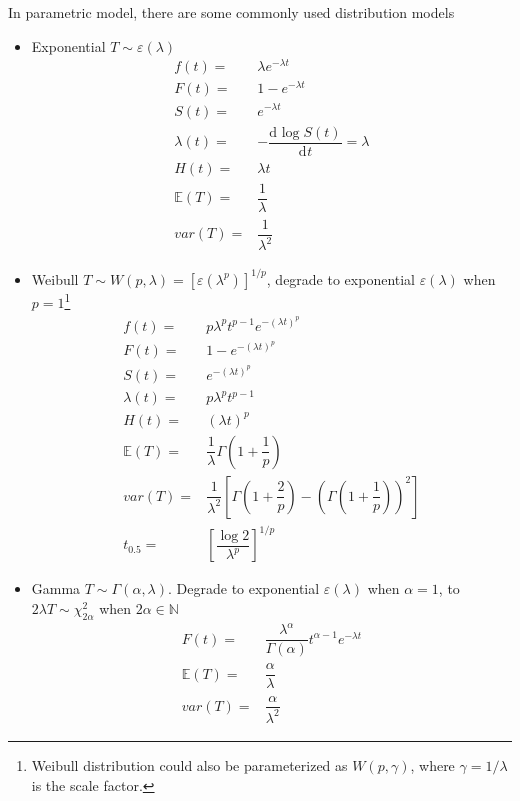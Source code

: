 In parametric model, there are some commonly used distribution models
\begin{itemize}[topsep=2pt,itemsep=0pt]
    \item Exponential $ T\sim \varepsilon (\lambda ) $
    \begin{align}
        f(t)=&\lambda e^{-\lambda t}\\
    F(t)=&1- e^{-\lambda t}\\
    S(t)=&e^{-\lambda t}\\
    \lambda (t)=&-\dfrac{\mathrm{d}^{} \log S(t)}{\mathrm{d}^{}t}=\lambda \\
    H(t)=&\lambda t\\
    \mathbb{E}(T)=&\dfrac{1}{\lambda }\\
    var(T)=&\dfrac{1}{\lambda ^2}
    \end{align}
    \item Weibull $T\sim W(p,\lambda )=\left[\varepsilon (\lambda ^p)\right]^{1/p}$, degrade to exponential $ \varepsilon (\lambda ) $ when $ p=1 $\footnote{Weibull distribution could also be parameterized as $ W(p,\gamma ) $, where $ \gamma =1/\lambda  $ is the scale factor.}
    \begin{align}
        f(t)=&p\lambda ^pt^{p-1}e^{-(\lambda t)^p}\\
        F(t)=&1-e^{-(\lambda t)^p}\\
        S(t)=&e^{-(\lambda t)^p}\\
        \lambda (t)=&p\lambda ^pt^{p-1}\\
        H(t)=&(\lambda t)^p\\
        \mathbb{E}(T)=&\dfrac{1}{\lambda }\Gamma(1+\dfrac{1}{p})\\
        var(T)=&\dfrac{1}{\lambda ^2}\left[ \Gamma (1+\dfrac{2}{p})-(\Gamma (1+\dfrac{1}{p}))^2 \right]\\
        t_{0.5}=&\left[ \dfrac{\log 2}{\lambda ^p} \right]^{1/p}
    \end{align}
    \item Gamma $T\sim \Gamma (\alpha ,\lambda )$. Degrade to exponential $ \varepsilon (\lambda ) $ when $ \alpha =1 $, to $ 2\lambda T\sim \chi^2_{2\alpha }  $ when $ 2\alpha \in\mathbb{N} $
    \begin{align}
        F(t)=&\dfrac{\lambda ^\alpha}{\Gamma (\alpha )} t^{\alpha -1}e^{-\lambda t}\\
        \mathbb{E}(T)=&\dfrac{\alpha }{\lambda }\\
        var(T)=&\dfrac{\alpha }{\lambda ^2}

\end{align}
\end{itemize}

